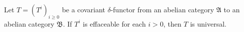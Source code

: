 Let $T = (T^i)_{i \geqslant 0}$ be a covariant $\delta$-functor from an abelian category $\mathfrak{A}$ to an abelian category $\mathfrak{B}$. If $T^i$ is effaceable for each $i > 0$, then $T$ is universal.
